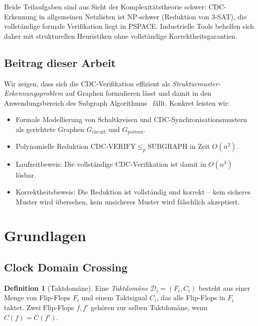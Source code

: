 ﻿\documentclass[a4paper,12pt]{article}
\theoremstyle{definition}
\newtheorem{definition}{Definition}
\begin{document}
	Beide Teilaufgaben sind aus Sicht der Komplexit\"atstheorie schwer:
	CDC-Erkennung in allgemeinen Netzlisten ist NP-schwer (Reduktion von 3-SAT),
	die vollst\"andige formale Verifikation liegt in PSPACE.
	Industrielle Tools behelfen sich daher mit strukturellen Heuristiken ohne
	vollst\"andige Korrektheitsgarantien.
	
	\subsection{Beitrag dieser Arbeit}
	
	Wir zeigen, dass sich die CDC-Verifikation effizient als
	\emph{Strukturmuster-Erkennungsproblem} auf Graphen formulieren l\"asst
	und damit in den Anwendungsbereich des Subgraph Algorithmus~\cite{epp2026subgraph}
	f\"allt. Konkret leisten wir:
	
	\begin{itemize}
		\item Formale Modellierung von Schaltkreisen und CDC-Synchronisationsmustern
		als gerichtete Graphen $G_{\mathrm{circuit}}$ und $G_{\mathrm{pattern}}$.
		\item Polynomielle Reduktion $\mathrm{CDC\text{-}VERIFY} \leq_p \mathrm{SUBGRAPH}$
		in Zeit $O(n^2)$.
		\item Laufzeitbeweis: Die vollst\"andige CDC-Verifikation ist damit in $O(n^3)$
		l\"osbar.
		\item Korrektheitsbeweis: Die Reduktion ist vollst\"andig und korrekt --
		kein sicheres Muster wird \"ubersehen, kein unsicheres Muster wird
		f\"alschlich akzeptiert.
	\end{itemize}
	
	\section{Grundlagen}
	
	\subsection{Clock Domain Crossing}
	
	\begin{definition}[Taktdom\"ane]
		Eine \emph{Taktdom\"ane} $\mathcal{D}_i = (F_i, C_i)$ besteht aus einer Menge von
		Flip-Flops $F_i$ und einem Taktsignal $C_i$, das alle Flip-Flops in $F_i$ taktet.
		Zwei Flip-Flops $f, f'$ geh\"oren zur selben Taktdom\"ane, wenn $C(f) = C(f')$.
	\end{definition}
	
\end{document}
